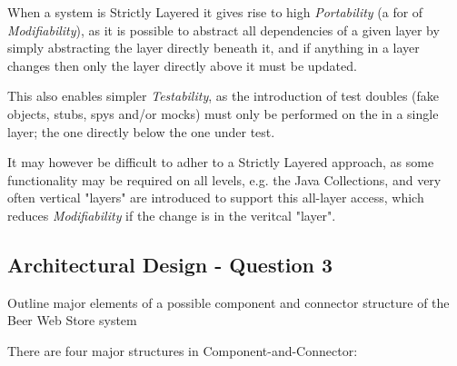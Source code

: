 When a system is Strictly Layered it gives rise to high \emph{Portability} (a for of \emph{Modifiability}), as it is possible to abstract all dependencies of a given layer by simply abstracting the layer directly beneath it, and if anything in a layer changes then only the layer directly above it must be updated.

This also enables simpler \emph{Testability}, as the introduction of test doubles (fake objects, stubs, spys and/or mocks) must only be performed on the in a single layer; the one directly below the one under test.

It may however be difficult to adher to a Strictly Layered approach, as some functionality may be required on all levels, e.g. the Java Collections, and very often vertical "layers" are introduced to support this all-layer access, which reduces \emph{Modifiability} if the change is in the veritcal "layer".

\subsection{Architectural Design - Question 3}

\begin{question}
Outline major elements of a possible component and connector
structure of the Beer Web Store system
\end{question}

There are four major structures in Component-and-Connector:

